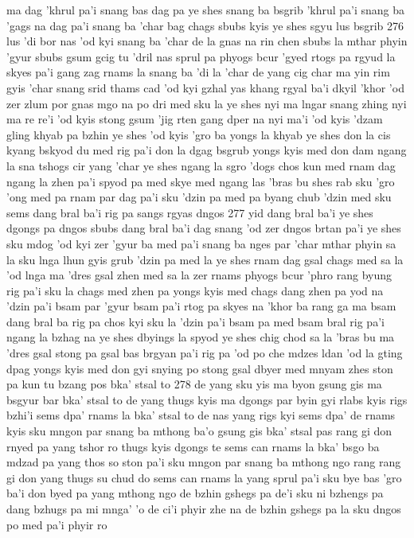 ma dag 'khrul pa'i snang bas dag pa ye shes snang ba bsgrib
'khrul pa'i snang ba 'gags na dag pa'i snang ba 'char
bag chags sbubs kyis ye shes sgyu lus bsgrib
276
lus 'di bor nas 'od kyi snang ba 'char
de la gnas na rin chen sbubs la mthar phyin 'gyur
sbubs gsum gcig tu 'dril nas sprul pa phyogs bcur 'gyed
rtogs pa rgyud la skyes pa'i gang zag rnams la snang ba 'di la 'char
de yang cig char ma yin rim gyis 'char
snang srid thams cad 'od kyi gzhal yas khang
rgyal ba'i dkyil 'khor 'od zer zlum por gnas
mgo na po dri med sku la ye shes nyi ma lngar snang zhing
nyi ma re re'i 'od kyis stong gsum 'jig rten gang
dper na nyi ma'i 'od kyis 'dzam gling khyab pa bzhin
ye shes 'od kyis 'gro ba yongs la khyab
ye shes don la cis kyang bskyod du med
rig pa'i don la dgag bsgrub yongs kyis med
don dam ngang la sna tshogs cir yang 'char
ye shes ngang la sgro 'dogs chos kun med
rnam dag ngang la zhen pa'i spyod pa med
skye med ngang las 'bras bu shes rab sku
'gro 'ong med pa rnam par dag pa'i sku
'dzin pa med pa byang chub 'dzin med sku
sems dang bral ba'i rig pa sangs rgyas dngos
277
yid dang bral ba'i ye shes dgongs pa dngos
sbubs dang bral ba'i dag snang 'od zer dngos
brtan pa'i ye shes sku mdog 'od kyi zer
'gyur ba med pa'i snang ba nges par 'char
mthar phyin sa la sku lnga lhun gyis grub
'dzin pa med la ye shes rnam dag gsal
chags med sa la 'od lnga ma 'dres gsal
zhen med sa la zer rnams phyogs bcur 'phro
rang byung rig pa'i sku la chags med zhen pa yongs kyis med
chags dang zhen pa yod na 'dzin pa'i bsam par 'gyur
bsam pa'i rtog pa skyes na 'khor ba rang ga ma
bsam dang bral ba rig pa chos kyi sku la 'dzin pa'i bsam pa med
bsam bral rig pa'i ngang la bzhag na ye shes dbyings la spyod
ye shes chig chod sa la 'bras bu ma 'dres gsal
stong pa gsal bas brgyan pa'i rig pa 'od po che
mdzes ldan 'od la gting dpag yongs kyis med
don gyi snying po stong gsal dbyer med mnyam
zhes ston pa kun tu bzang pos bka' stsal to
278
de yang sku yis ma byon gsung gis ma bsgyur bar bka' stsal to
de yang thugs kyis ma dgongs par byin gyi rlabs kyis rigs bzhi'i sems dpa' rnams la bka' stsal to
de nas yang rigs kyi sems dpa' de rnams kyis
sku mngon par snang ba mthong ba'o
gsung gis bka' stsal pas rang gi don rnyed pa yang tshor ro
thugs kyis dgongs te sems can rnams la bka' bsgo ba mdzad pa yang thos so
ston pa'i sku mngon par snang ba mthong ngo
rang rang gi don yang thugs su chud do
sems can rnams la yang sprul pa'i sku bye bas 'gro ba'i don byed pa yang mthong ngo
de bzhin gshegs pa de'i sku ni bzhengs pa dang bzhugs pa mi mnga' 'o
de ci'i phyir zhe na de bzhin gshegs pa la sku dngos po med pa'i phyir ro
